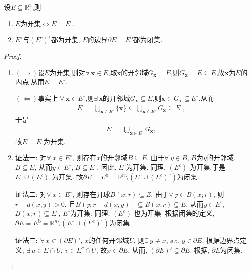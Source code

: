 \documentclass[../../main.tex]{subfiles}%
\begin{document}
\begin{theorem}
设$E \subseteq \mathbb{R}^n$,则
\begin{enumerate}[(1)]
\item $E$为开集$\iff E=E^\circ$.

\item  $E^\circ$与$(E^c)^\circ$都为开集, $E$的边界$\partial E = E^{\mathrm{b}}$都为闭集.
\end{enumerate}
\end{theorem}
\begin{proof}
\begin{enumerate}[(1)]
\item $(\Rightarrow)$设$E$为开集,则对$\forall\,\boldsymbol{x}\in E$,取$\boldsymbol{x}$的开邻域$G_{\boldsymbol{x}}=E$,则$G_{\boldsymbol{x}}=E\subseteq E$,故$\boldsymbol{x}$为$E$的内点,从而$E=E^\circ$.

$(\Leftarrow)$事实上,$\forall\,\boldsymbol{x}\in E^\circ$,则$\exists\,\boldsymbol{x}$的开邻域$G_{\boldsymbol{x}}\subseteq E$,则$\boldsymbol{x}\in G_{\boldsymbol{x}}\subseteq E^\circ$.从而
\begin{align*}
E^\circ=\bigcup_{\boldsymbol{x}\in E^\circ}\{\boldsymbol{x}\}\subseteq\bigcup_{\boldsymbol{x}\in E^\circ}G_{\boldsymbol{x}}\subseteq E^\circ,
\end{align*}
于是
\begin{align*}
E^\circ=\bigcup_{\boldsymbol{x}\in E^\circ}G_{\boldsymbol{x}},
\end{align*}
故$E=E^\circ$为开集.

\item {\color{blue}证法一:}
对$\forall\ x \in E^\circ$, 则存在$x$的开邻域$B \subseteq E$. 由于$\forall\ y \in B$, $B$为$y$的开邻域, $B \subseteq E$, 从而$y \in E^\circ$, $B \subseteq E^\circ$. 因此, $E^\circ$为开集. 同理, $(E^c)^\circ$为开集.于是$E^\circ \cup (E^c)^\circ$为开集. 故$\partial E = E^{\mathrm{b}} = \mathbb{R}^n \setminus (E^\circ \cup (E^c)^\circ)$为闭集.

{\color{blue}证法二:}
对$\forall\ x \in E^\circ$, 则存在开球$B(x; r) \subseteq E$. 由于$\forall\ y \in B(x; r)$, 则$r - d(x,y) > 0$, 且$B(y; r - d(x,y)) \subseteq B(x; r) \subseteq E$, 从而$y \in E^\circ$, $B(x; r) \subseteq E^\circ$, $E^\circ$为开集. 同理, $(E^c)^\circ$也为开集. 根据闭集的定义, $\partial E = E^{\mathrm{b}} = \mathbb{R}^n \setminus (E^\circ \cup (E^c)^\circ)$为闭集.

{\color{blue}证法三:}
$\forall\ x \in (\partial E)'$, $x$的任何开邻域$U$, 则$\exists\ y \neq x$, s.t. $y \in \partial E$. 根据边界点定义, $\exists\ u \in E \cap U$, $v \in E^c \cap U$, 故$x \in \partial E$. 从而, $(\partial E)' \subseteq \partial E$. 根据, $\partial E$为闭集.


\end{enumerate}
\end{proof}
\end{document}
